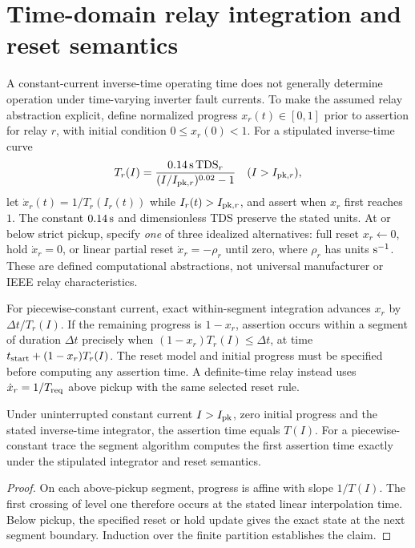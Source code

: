 \section{Time-domain relay integration and reset semantics}
\label{sec:relay-integration}
A constant-current inverse-time operating time does not generally determine operation under time-varying inverter fault currents. To make the assumed relay abstraction explicit, define normalized progress \(x_r(t)\in[0,1]\) prior to assertion for relay \(r\), with initial condition \(0\le x_r(0)<1\). For a stipulated inverse-time curve
\[
T_r(I)=\frac{0.14\,{\rm s}\,\mathrm{TDS}_r}{(I/I_{{\rm pk},r})^{0.02}-1}\quad (I>I_{{\rm pk},r}),
\]
let \(\dot x_r(t)=1/T_r(I_r(t))\) while \(I_r(t)>I_{{\rm pk},r}\), and assert when \(x_r\) first reaches \(1\). The constant \(0.14\,{\rm s}\) and dimensionless TDS preserve the stated units. At or below strict pickup, specify \emph{one} of three idealized alternatives: full reset \(x_r\leftarrow0\), hold \(\dot x_r=0\), or linear partial reset \(\dot x_r=-\rho_r\) until zero, where \(\rho_r\) has units \({\rm s}^{-1}\). These are defined computational abstractions, not universal manufacturer or IEEE relay characteristics.

For piecewise-constant current, exact within-segment integration advances \(x_r\) by \(\Delta t/T_r(I)\). If the remaining progress is \(1-x_r\), assertion occurs within a segment of duration \(\Delta t\) precisely when \((1-x_r)T_r(I)\le\Delta t\), at time \(t_{\rm start}+(1-x_r)T_r(I)\). The reset model and initial progress must be specified before computing any assertion time. A definite-time relay instead uses \(\dot x_r=1/T_{\rm req}\) above pickup with the same selected reset rule.

\begin{proposition}
Under uninterrupted constant current \(I>I_{\rm pk}\), zero initial progress and the stated inverse-time integrator, the assertion time equals \(T(I)\). For a piecewise-constant trace the segment algorithm computes the first assertion time exactly under the stipulated integrator and reset semantics.
\end{proposition}
\begin{proof}
On each above-pickup segment, progress is affine with slope \(1/T(I)\). The first crossing of level one therefore occurs at the stated linear interpolation time. Below pickup, the specified reset or hold update gives the exact state at the next segment boundary. Induction over the finite partition establishes the claim.
\end{proof}
